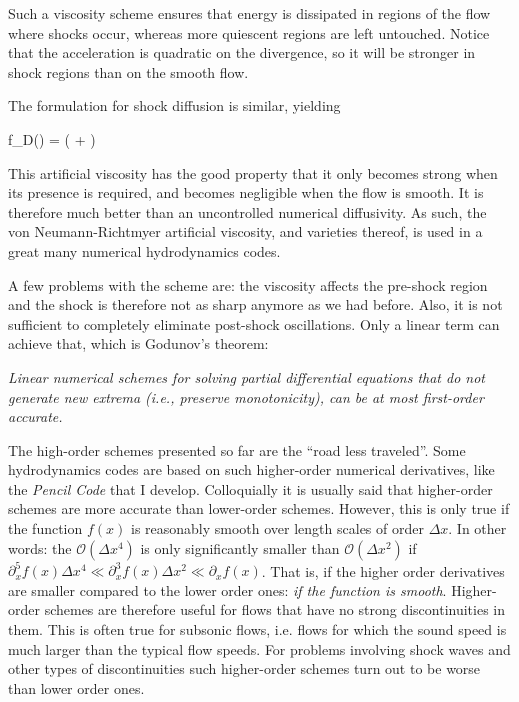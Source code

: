 Such a viscosity scheme ensures that energy is dissipated in regions
of the flow where shocks occur, whereas more quiescent regions are
left untouched. Notice that the acceleration is quadratic on the
divergence, so it will be stronger in shock regions than on the smooth
flow. 

The formulation for shock diﬀusion is similar, yielding

\beq
 f_D(\rho) = \zeta\left(\Laplace{\rho} + \grad{\ln\zeta}\cdot\grad{\rho}\right)
\eeq

This artificial viscosity has the good property that it only becomes
strong when its presence is required, and becomes negligible when the
flow is smooth. It is therefore much better than an uncontrolled
numerical diffusivity. As such, the von Neumann-Richtmyer artificial
viscosity, and varieties thereof, is used in a great many numerical hydrodynamics codes.

A few problems with the scheme are: the viscosity
affects the pre-shock region and the shock is therefore not as sharp
anymore as we had before. Also, it is not sufficient to completely
eliminate post-shock oscillations. Only a linear term can achieve
that, which is Godunov's theorem: 

{\it Linear numerical schemes for solving partial differential equations that do not generate
new extrema (i.e., preserve monotonicity), can be at most first-order accurate.}



The high-order schemes presented so far are the ``road less
traveled''.  Some hydrodynamics codes are based on such higher-order
numerical derivatives, like the {\it Pencil Code} that I
develop. Colloquially it is usually said that higher-order
schemes are more accurate than lower-order schemes.
However, this is only true if the function $f(x)$ is reasonably
smooth over length scales of order $\Delta x$.
In other words: the ${\mathcal O}(\Delta x^4)$ is only significantly
smaller than ${\mathcal O}(\Delta x^2)$ if $\partial^5_xf(x)\Delta x^4
\ll \partial^3_xf(x)\Delta x^2 \ll \partial_x f(x)$. That is, if the
higher order derivatives are smaller compared to the lower order
ones: {\it if the function is smooth}.
Higher-order schemes are therefore useful for flows that have no strong
discontinuities in them. This is often true for subsonic flows,
i.e. flows for which the sound speed is much larger than the typical
flow speeds. For problems involving shock waves and other types of
discontinuities such higher-order schemes turn out to be worse than
lower order ones. 

